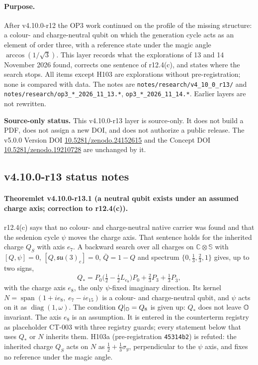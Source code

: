 \paragraph{Purpose.}
After v4.10.0-r12 the OP3 work continued on the profile of the missing structure: a colour- and charge-neutral qubit on
which the generation cycle acts as an element of order three, with a reference state under the magic angle
\(\arccos(1/\sqrt3)\).  This layer records what the explorations of 13 and 14 November 2026 found, corrects one sentence of
r12.4(c), and states where the search stops.  All items except H103 are explorations without pre-registration; none is
compared with data.  The notes are \texttt{notes/\allowbreak research/\allowbreak v4\_10\_0\_r13/} and
\texttt{notes/\allowbreak research/\allowbreak op3\_*\_2026\_11\_13.*}, \texttt{op3\_*\_2026\_11\_14.*}.  Earlier layers are not rewritten.

\noindent\textbf{Source-only status.}
This v4.10.0-r13 layer is source-only.  It does not build a PDF, does not assign a new DOI,
and does not authorize a public release.  The v5.0.0 Version DOI
\href{https://doi.org/10.5281/zenodo.24152615}{10.5281/zenodo.24152615} and the Concept DOI
\href{https://doi.org/10.5281/zenodo.19210728}{10.5281/zenodo.19210728} are unchanged by it.

\subsection*{v4.10.0-r13 status notes}
\label{subsec:v4100-r13-status}

\paragraph{Theoremlet v4.10.0-r13.1 (a neutral qubit exists under an assumed charge axis; correction to r12.4(c)).}
r12.4(c) says that no colour- and charge-neutral native carrier was found and that the sedenion cycle \(\psi\) moves the
charge axis.  That sentence holds for the inherited charge \(Q_S\) with axis \(e_7\).  A backward search over all charges on
\(\mathbb C\otimes\mathbb S\) with \([Q,\psi]=0\), \([Q,\mathfrak{su}(3)_c]=0\), \(\bar Q=1-Q\) and spectrum
\(\{0,\tfrac13,\tfrac23,1\}\) gives, up to two signs,
\[
Q_*=P_0\bigl(\tfrac12-\tfrac i2 L_{e_8}\bigr)P_0+\tfrac23P_3+\tfrac13P_{\bar3},
\]
with the charge axis \(e_8\), the only \(\psi\)-fixed imaginary direction.  Its kernel
\(N=\operatorname{span}(1+ie_8,\;e_7-ie_{15})\) is a colour- and charge-neutral qubit, and \(\psi\) acts on it as
\(\operatorname{diag}(1,\omega)\).  The condition \(Q|_{\mathbb{O}}=Q_8\) is given up: \(Q_*\) does not leave \(\mathbb{O}\) invariant.
The axis \(e_8\) is an assumption.  It is entered in the counterterm registry as placeholder CT-003 with three registry
guards; every statement below that uses \(Q_*\) or \(N\) inherits them.  H103a (pre-registration \texttt{45314b2}) is
refuted: the inherited charge \(Q_S\) acts on \(N\) as \(\tfrac12+\tfrac13\sigma_y\), perpendicular to the \(\psi\) axis, and fixes
no reference under the magic angle.

